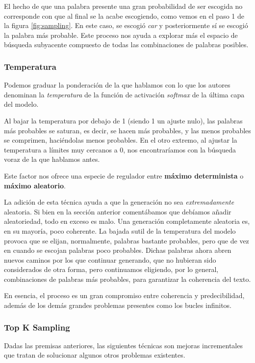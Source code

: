 El hecho de que una palabra presente una gran probabilidad de ser escogida no corresponde con que al final se la acabe escogiendo, como vemos en el paso 1 de la figura \ref{fig:sampling}. En este caso, se escogió \textit{car} y posteriormente sí se escogió la palabra más probable. Este proceso nos ayuda a explorar más el espacio de búsqueda subyacente compuesto de todas las combinaciones de palabras posibles.

\subsubsection{Temperatura}
Podemos graduar la ponderación de la que hablamos con lo que los autores denominan la \textit{temperatura} de la función de activación \textit{softmax} de la última capa del modelo.

Al bajar la temperatura por debajo de 1 (siendo 1 un ajuste nulo), las palabras más probables se saturan, es decir, se hacen más probables, y las menos probables se comprimen, haciéndolas menos probables. En el otro extremo, al ajustar la temperatura a límites muy cercanos a 0, nos encontraríamos con la búsqueda voraz de la que hablamos antes.

Este factor nos ofrece una especie de regulador entre \textbf{máximo determinista} o \textbf{máximo aleatorio}.

La adición de esta técnica ayuda a que la generación no sea \textit{extremadamente} aleatoria. Si bien en la sección anterior comentábamos que debíamos añadir aleatoriedad, todo en exceso es malo. Una generación completamente aleatoria es, en su mayoría, poco coherente. La bajada sutil de la temperatura del modelo provoca que se elijan, normalmente, palabras bastante probables, pero que de vez en cuando se escojan palabras poco probables. Dichas palabras ahora abren nuevos caminos por los que continuar generando, que no hubieran sido considerados de otra forma, pero continuamos eligiendo, por lo general, combinaciones de palabras más probables, para garantizar la coherencia del texto.

En esencia, el proceso es un gran compromiso entre coherencia y predecibilidad, además de los demás grandes problemas presentes como los bucles infinitos.

\subsubsection{Top K Sampling}

Dadas las premisas anteriores, las siguientes técnicas son mejoras incrementales que tratan de solucionar algunos otros problemas existentes.

